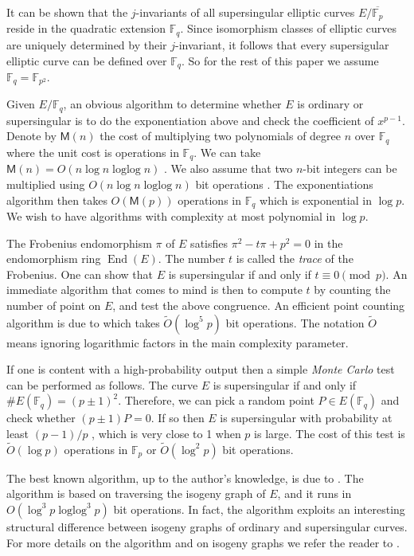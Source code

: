 \documentclass[12pt]{article}
\theoremstyle{plain}
\theoremstyle{definition}
\newcommand{\tildO}{\tilde{O}}
\DeclareMathOperator{\ringofend}{End} %
\DeclareMathOperator{\loglog}{loglog}
\def\F{\ensuremath{\mathbb{F}}}
\def\MM{\ensuremath{\mathsf{M}}}
\begin{document}
It can be shown that the $j$-invariants of all supersingular elliptic curves $E / \overline{\F_p}$ 
reside in the quadratic extension $\F_q$. Since isomorphism classes of elliptic curves are 
uniquely determined by their $j$-invariant, it follows that every supersigular elliptic curve can 
be defined over $\F_q$. So for the rest of this paper we assume $\F_q = \F_{p^2}$. 

Given $E / \F_q$, an obvious algorithm to determine whether $E$ is ordinary or supersingular is to 
do the exponentiation above and check the coefficient of $x^{p - 1}$. Denote by $\MM(n)$ the cost 
of multiplying two polynomials of degree $n$ over $\F_q$ where the unit cost is operations in 
$\F_q$. We can take $\MM(n) = O(n\log n \loglog n)$ \cite{vzGG}. We also assume that two $n$-bit 
integers can be multiplied using $O(n\log n \loglog n)$ bit operations \cite{vzGG}. The 
exponentiations algorithm then takes $O(\MM(p))$ operations in $\F_q$ which is exponential in $\log 
p$. We wish to have algorithms with complexity at most polynomial in $\log p$.

The Frobenius endomorphism $\pi$ of $E$ satisfies $\pi^2 - t\pi + p^2 = 0$ in the endomorphism ring 
$\ringofend(E)$. The number $t$ is called the \textit{trace} of the Frobenius. One can show that 
$E$ is supersingular if and only if $t \equiv 0 \pmod{p}$. An immediate algorithm that comes to 
mind is then to compute $t$ by counting the number of point on $E$, and test the above congruence. 
An efficient point counting algorithm is due to \cite{schoof85} which takes $\tildO(\log^5 p)$ bit 
operations. The notation $\tildO$ means ignoring logarithmic factors in the main complexity 
parameter.

If one is content with a high-probability output then a simple \textit{Monte Carlo} test can be 
performed as follows. The curve $E$ is supersingular if and only if $\#E(\F_q) = (p \pm 1)^2$. 
Therefore, we can pick a random point $P \in E(\F_q)$ and check whether $(p \pm 1)P = 0$. If so 
then $E$ is supersingular with probability at least $(p - 1) / p$ \cite[Prop. 2]{sutherland2012}, 
which is very close to 1 when $p$ is large. The cost of this test is $\tildO(\log p)$ operations in 
$\F_p$ or $\tildO(\log^2 p)$ bit operations.

The best known algorithm, up to the author's knowledge, is due to \cite{sutherland2012}. The 
algorithm is based on traversing the isogeny graph of $E$, and it runs in $O(\log^3p \loglog^3p)$ 
bit operations. In fact, the algorithm exploits an interesting structural difference between 
isogeny graphs of ordinary and supersingular curves. For more details on the algorithm and on 
isogeny graphs we refer the reader to \cite{sutherland2012, kohel1996}.
\end{document}
